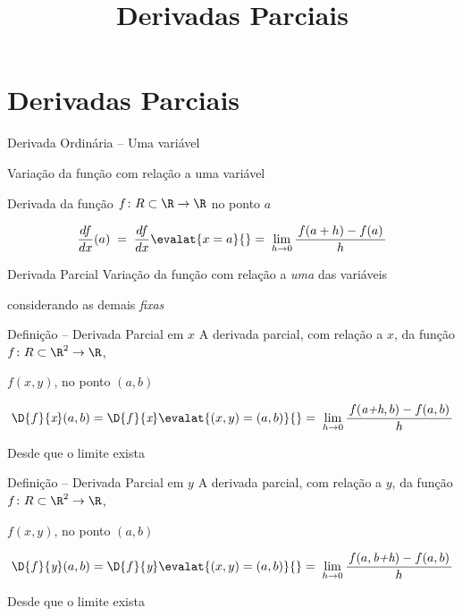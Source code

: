 \documentclass[fleqn,utf8,aspectratio=169,12pt]{beamer}
\title{Derivadas Parciais}
\begin{document}
\addtitle

\section{Derivadas Parciais}

\begin{frame}{Derivada Ordinária -- Uma variável}

  Variação da função com relação a uma variável

  \pause
  \vspace{\baselineskip}
  Derivada da função \(f\colon R\subset\R\to\R\) no ponto $a$

  \[
    \frac{df}{dx}(a)
    \;=\; \frac{df}{dx}\evalat{x=a}{}
    =\; \lim_{h\to 0} \frac{\,f(a+h)-f(a)\,}{h}
  \]
\end{frame}

\begin{frame}{Derivada Parcial}
  Variação da função com relação a \emph{uma} das variáveis

  considerando as demais \emph{fixas}
\end{frame}

\begin{frame}{Definição -- Derivada Parcial em $x$}
  A derivada parcial, com relação a \emph{$x$},
  da função \(f\colon R\subset\R^2\to\R\),

  \pause
  \(f(x, y)\),
  no ponto \((a, b)\)

  \pause
  \[
    \D{f}{\emph{x}}(a, b)
    = \D{f}{\emph{x}}\evalat{(x, y) = (a, b)}{}
    =\; \lim_{h\to 0} \frac{\,f(\emph{a+h}, b)-f(a, b)\,}{h}
  \]

  \vspace{\baselineskip}
  Desde que o limite exista
\end{frame}

\begin{frame}{Definição -- Derivada Parcial em $y$}
  A derivada parcial, com relação a \emph{$y$},
  da função \(f\colon R\subset\R^2\to\R\),

  \pause
  \(f(x, y)\),
  no ponto \((a, b)\)

  \pause
  \[
    \D{f}{\emph{y}}(a, b)
    = \D{f}{\emph{y}}\evalat{(x, y) = (a, b)}{}
    =\; \lim_{h\to 0} \frac{\,f(a, \emph{b+h})-f(a, b)\,}{h}
  \]

  \vspace{\baselineskip}
  Desde que o limite exista
\end{frame}
\end{document}
